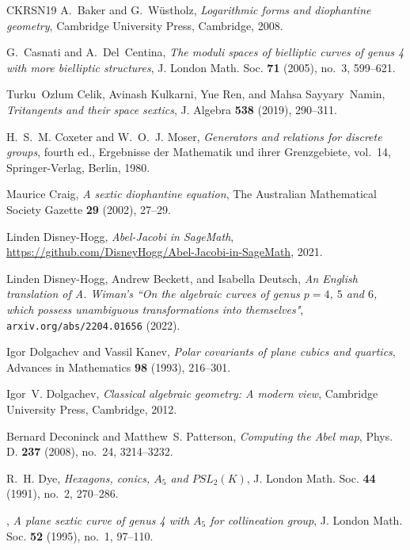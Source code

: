 \documentclass{amsart}
\begin{document}
\begin{thebibliography}{CKRSN19}
A.~Baker and G.~Wüstholz, \emph{Logarithmic forms and diophantine geometry},
  Cambridge University Press, Cambridge, 2008.

G.~Casnati and A.~Del~Centina, \emph{The moduli spaces of bielliptic curves of
  genus 4 with more bielliptic structures}, J. London Math. Soc. \textbf{71}
  (2005), no.~3, 599--621.

Turku~Ozlum Celik, Avinash Kulkarni, Yue Ren, and Mahsa Sayyary~Namin,
  \emph{Tritangents and their space sextics}, J. Algebra \textbf{538} (2019),
  290--311.

H.~S.~M. Coxeter and W.~O.~J. Moser, \emph{Generators and relations for
  discrete groups}, fourth ed., Ergebnisse der Mathematik und ihrer
  Grenzgebiete, vol.~14, Springer-Verlag, Berlin, 1980.

Maurice Craig, \emph{A sextic diophantine equation}, The Australian
  Mathematical Society Gazette \textbf{29} (2002), 27--29.

Linden Disney-Hogg, \emph{Abel-{J}acobi in {S}age{M}ath},
  \url{https://github.com/DisneyHogg/Abel-Jacobi-in-SageMath}, 2021.

Linden Disney-Hogg, Andrew Beckett, and Isabella Deutsch, \emph{An {E}nglish
  translation of {A}. {W}iman's ``{O}n the algebraic curves of genus {$p=4$},
  {$5$} and {$6$}, which possess unambiguous transformations into themselves"},
  {\tt arxiv.org/abs/2204.01656} (2022).

Igor Dolgachev and Vassil Kanev, \emph{Polar covariants of plane cubics and
  quartics}, Advances in Mathematics \textbf{98} (1993), 216--301.

Igor~V. Dolgachev, \emph{Classical algebraic geometry: A modern view},
  Cambridge University Press, Cambridge, 2012.

Bernard Deconinck and Matthew~S. Patterson, \emph{Computing the {A}bel map},
  Phys. D. \textbf{237} (2008), no.~24, 3214--3232.

R.~H. Dye, \emph{Hexagons, conics, {$A_5$} and {$PSL_2(K)$}}, J. London Math.
  Soc. \textbf{44} (1991), no.~2, 270--286.

\bysame, \emph{A plane sextic curve of genus 4 with {$A_5$} for collineation
  group}, J. London Math. Soc. \textbf{52} (1995), no.~1, 97--110.


\end{thebibliography}
\end{document}
